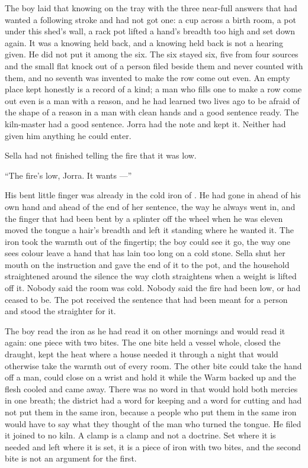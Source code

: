 The boy laid that knowing on the tray with the three near-full answers that had wanted a following stroke and had not got one: a cup across a birth room, a pot under this shed's wall, a rack pot lifted a hand's breadth too high and set down again. It was a knowing held back, and a knowing held back is not a hearing given. He did not put it among the six. The six stayed six, five from four sources and the small flat knock out of a person filed beside them and never counted with them, and no seventh was invented to make the row come out even. An empty place kept honestly is a record of a kind; a man who fills one to make a row come out even is a man with a reason, and he had learned two lives ago to be afraid of the shape of a reason in a man with clean hands and a good sentence ready. The kiln-master had a good sentence. Jorra had the note and kept it. Neither had given him anything he could enter.

\scenebreak

Sella had not finished telling the fire that it was low.

“The fire's low, Jorra. It wants ---”

His bent little finger was already in the cold iron of . He had gone in ahead of his own hand and ahead of the end of her sentence, the way he always went in, and the finger that had been bent by a splinter off the wheel when he was eleven moved the tongue a hair's breadth and left it standing where he wanted it. The iron took the warmth out of the fingertip; the boy could see it go, the way one sees colour leave a hand that has lain too long on a cold stone. Sella shut her mouth on the instruction and gave the end of it to the pot, and the household straightened around the silence the way cloth straightens when a weight is lifted off it. Nobody said the room was cold. Nobody said the fire had been low, or had ceased to be. The pot received the sentence that had been meant for a person and stood the straighter for it.

The boy read the iron as he had read it on other mornings and would read it again: one piece with two bites. The one bite held a vessel whole, closed the draught, kept the heat where a house needed it through a night that would otherwise take the warmth out of every room. The other bite could take the hand off a man, could close on a wrist and hold it while the Warm backed up and the flesh cooled and came away. There was no word in  that would hold both mercies in one breath; the district had a word for keeping and a word for cutting and had not put them in the same iron, because a people who put them in the same iron would have to say what they thought of the man who turned the tongue. He filed it joined to no kiln. A clamp is a clamp and not a doctrine. Set where it is needed and left where it is set, it is a piece of iron with two bites, and the second bite is not an argument for the first.

